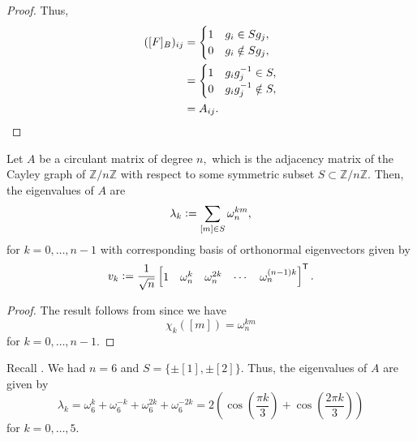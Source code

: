 \begin{proof}
    Thus, 
    \begin{align*} 
        ([F]_B)_{ij} &= \begin{cases}
            1 & g_i \in Sg_j,\\
            0 & g_i \notin Sg_j,
        \end{cases}\\
        &= \begin{cases}
            1 & g_ig_j^{-1} \in S,\\
            0 & g_ig_j^{-1} \notin S,
        \end{cases}\\
        &= A_{ij}. \qedhere
    \end{align*}
\end{proof}

\begin{cor}
    Let $A$ be a circulant matrix of degree $n,$ which is the adjacency matrix of the Cayley graph of $\mathbb{Z}/n\mathbb{Z}$ with respect to some symmetric subset $S \subset \mathbb{Z}/n\mathbb{Z}.$ Then, the eigenvalues of $A$ are
    \begin{equation*} 
        \lambda_k \vcentcolon= \sum_{[m] \in S} \omega_n^{km},
    \end{equation*}
    for $k = 0, \ldots, n - 1$ with corresponding basis of orthonormal eigenvectors given by
    \begin{equation*} 
        v_k \vcentcolon= \frac{1}{\sqrt{n}}\begin{bmatrix}
            1 & \omega_n^{k} & \omega_n^{2k} & \cdots & \omega_n^{(n - 1)k}
        \end{bmatrix}^\mathsf{T}.
    \end{equation*}
\end{cor}
\begin{proof} 
    The result follows from  since we have
    \begin{equation*} 
        \chi_k([m]) = \omega_n^{km}
    \end{equation*}
    for $k = 0, \ldots, n - 1.$ 
\end{proof}

\begin{ex}
    Recall . We had $n = 6$ and $S = \{\pm [1], \pm [2]\}.$ Thus, the eigenvalues of $A$ are given by
    \begin{equation*} 
        \lambda_k = \omega_6^k + \omega_6^{-k} + \omega_6^{2k} + \omega_6^{-2k} = 2\left(\cos\left(\frac{\pi k}{3}\right) + \cos\left(\frac{2\pi k}{3}\right)\right)
    \end{equation*}
    for $k = 0, \ldots, 5.$
\end{ex}

